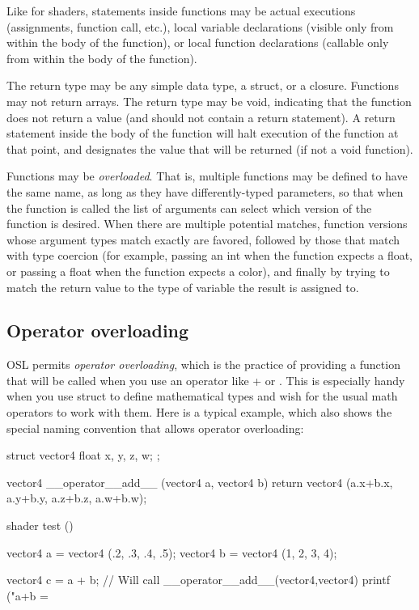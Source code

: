 \documentclass[11pt,letterpaper]{book}
\def\color{{\cf color}\xspace}
\begin{document}
Like for shaders, statements inside functions may be actual executions
(assignments, function call, etc.), local variable declarations (visible
only from within the body of the function), or local function
declarations (callable only from within the body of the function).

The return type may be any simple data type, a {\cf struct}, or a {\cf
  closure}.  Functions may not return arrays.  The return type may be
{\cf void}, indicating that the function does not return a value (and
should not contain a {\cf return} statement).  A {\cf return} statement
inside the body of the function will halt execution of the function at
that point, and designates the value that will be returned (if not a
{\cf void} function).

Functions may be \emph{overloaded}.  That is, multiple functions may be
defined to have the same name, as long as they have differently-typed
parameters, so that when the function is called the list of arguments can
select which version of the function is desired. When there are multiple
potential matches, function versions whose argument types match exactly are
favored, followed by those that match with type coercion (for example,
passing an {\cf int} when the function expects a {\cf float}, or passing a
{\cf float} when the function expects a \color), and finally by trying to
match the return value to the type of variable the result is assigned to.

\subsection{Operator overloading}
\label{sec:syntax:operatoroverloading}

\NEW  %
OSL permits \emph{operator overloading}, which is the practice of providing
a function that will be called when you use an operator like {\cf +} or
{\cf *}. This is especially handy when you use {\cf struct} to define
mathematical types and wish for the usual math operators to work with them.
Here is a typical example, which also shows the special naming convention
that allows operator overloading:

\begin{code}
    struct vector4 {
        float x, y, z, w;
    };

    vector4 __operator__add__ (vector4 a, vector4 b) {
        return vector4 (a.x+b.x, a.y+b.y, a.z+b.z, a.w+b.w);
    }

    shader test ()
    {
        vector4 a = vector4 (.2, .3, .4, .5);
        vector4 b = vector4 (1, 2, 3, 4);

        vector4 c = a + b;   // Will call __operator__add__(vector4,vector4)
        printf ("a+b = %
    }
\end{code}
\end{document}
